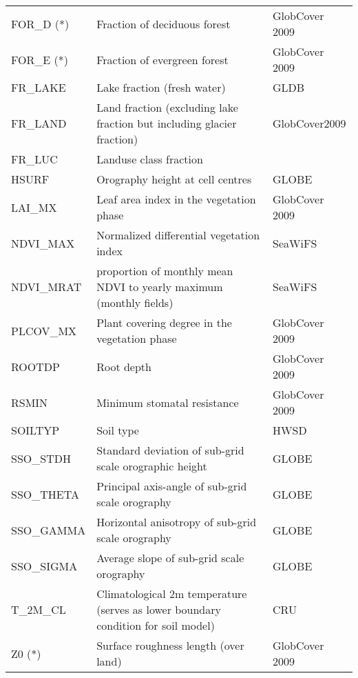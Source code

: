 \begin{longtable}{p{2.5cm}p{8.5cm}p{3.3cm}}
  FOR\_D (*)                            & Fraction of deciduous forest                    &        GlobCover 2009     \\
  FOR\_E (*)                            & Fraction of evergreen forest                    &        GlobCover 2009     \\
  FR\_LAKE                              & Lake fraction (fresh water)                     &        GLDB               \\                     
  FR\_LAND                              & Land fraction (excluding lake fraction but including glacier fraction) & GlobCover2009   \\
  FR\_LUC                               & Landuse class fraction                          &                           \\
  HSURF                                 & Orography height at cell centres                &        GLOBE              \\
  LAI\_MX                               & Leaf area index in the vegetation phase         &        GlobCover 2009     \\
  NDVI\_MAX                             & Normalized differential vegetation index        &        SeaWiFS            \\
  NDVI\_MRAT                            & proportion of monthly mean NDVI to yearly maximum (monthly fields)&  SeaWiFS \\
  PLCOV\_MX                             & Plant covering degree in the vegetation phase   &        GlobCover 2009     \\
  ROOTDP                                & Root depth                                      &        GlobCover 2009     \\
  RSMIN                                 & Minimum stomatal resistance                     &        GlobCover 2009     \\
  SOILTYP                               & Soil type                                       &        HWSD               \\
  SSO\_STDH                             & Standard deviation of sub-grid scale orographic height  &   GLOBE           \\
  SSO\_THETA                            & Principal axis-angle of sub-grid scale orography &          GLOBE           \\
  SSO\_GAMMA                            & Horizontal anisotropy of sub-grid scale orography &         GLOBE           \\
  SSO\_SIGMA                            & Average slope of sub-grid scale orography       &           GLOBE           \\
  T\_2M\_CL                             & Climatological 2m temperature (serves as lower boundary condition for soil model)  &  CRU \\
  Z0 (*)                                & Surface roughness length (over land)            &         GlobCover 2009    \\                        
  \bottomrule
\end{longtable}

